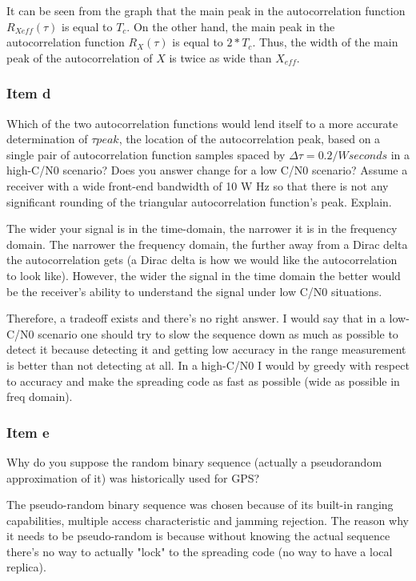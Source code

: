 It can be seen from the graph that the main peak in the autocorrelation function
$R_{Xeff} (\tau )$ is equal to $T_c$. On the other hand, the main peak in the
autocorrelation function $R_{X} (\tau )$ is equal to $2*T_c$. Thus, the
width of the main peak of the autocorrelation of $X$ is twice as wide than
$X_{eff}$.

\subsubsection{Item d}

Which of the two autocorrelation functions would lend itself to a more accurate
determination of $\tau peak$, the location of the autocorrelation peak, based on
a single pair of autocorrelation function samples spaced by
$\Delta \tau = 0.2/W seconds$ in a high-C/N0 scenario? Does you answer change for
a low C/N0 scenario? Assume a receiver with a wide front-end bandwidth of 10 W Hz
so that there is not any significant rounding of the triangular autocorrelation
function’s peak. Explain.


The wider your signal is in the time-domain, the narrower it is in the
frequency domain. The narrower the frequency domain, the further away from a
Dirac delta the autocorrelation gets (a Dirac delta is how we would like the
autocorrelation to look like).
However, the wider the signal in the time domain the better would be the
receiver's ability to understand the signal under low C/N0 situations.

Therefore, a tradeoff exists and there's no right answer. I would say
that in a low-C/N0 scenario one should try to slow the sequence down as
much as possible to detect it because detecting it and getting low
accuracy in the range measurement is better than not detecting at all. In
a high-C/N0 I would by greedy with respect to accuracy and make the
spreading code as fast as possible (wide as possible in freq domain).

\subsubsection{Item e}

Why do you suppose the random binary sequence (actually a pseudorandom
approximation of it) was historically used for GPS?

The pseudo-random binary sequence was chosen because of its built-in
ranging capabilities, multiple access characteristic and jamming
rejection. The reason why it needs to be pseudo-random is because without
knowing the actual sequence there's no way to actually "lock" to the
spreading code (no way to have a local replica).

